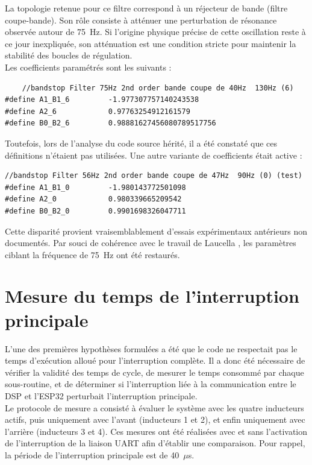 La topologie retenue pour ce filtre correspond à un réjecteur de bande (filtre coupe-bande). Son rôle consiste à atténuer une perturbation de résonance observée autour de 75~Hz. Si l'origine physique précise de cette oscillation reste à ce jour inexpliquée, son atténuation est une condition stricte pour maintenir la stabilité des boucles de régulation.\\

Les coefficients paramétrés sont les suivants :

\begin{verbatim}
    //bandstop Filter 75Hz 2nd order bande coupe de 40Hz  130Hz (6)
#define A1_B1_6         -1.977307757140243538
#define A2_6            0.97763254912161579
#define B0_B2_6         0.98881627456080789517756
\end{verbatim}

Toutefois, lors de l'analyse du code source hérité, il a été constaté que ces définitions n'étaient pas utilisées. Une autre variante de coefficients était active :

\begin{verbatim}
//bandstop Filter 56Hz 2nd order bande coupe de 47Hz  90Hz (0) (test)
#define A1_B1_0         -1.980143772501098
#define A2_0            0.980339665209542
#define B0_B2_0         0.9901698326047711
\end{verbatim}

Cette disparité provient vraisemblablement d'essais expérimentaux antérieurs non documentés. Par souci de cohérence avec le travail de Laucella \cite{Laucella}, les paramètres ciblant la fréquence de 75~Hz ont été restaurés.

\section{Mesure du temps de l'interruption principale}
L'une des premières hypothèses formulées a été que le code ne respectait pas le temps d'exécution alloué pour l'interruption complète. Il a donc été nécessaire de vérifier la validité des temps de cycle, de mesurer le temps consommé par chaque sous-routine, et de déterminer si l'interruption liée à la communication entre le DSP et l'ESP32 perturbait l'interruption principale.\\

Le protocole de mesure a consisté à évaluer le système avec les quatre inducteurs actifs, puis uniquement avec l'avant (inducteurs 1 et 2), et enfin uniquement avec l'arrière (inducteurs 3 et 4). Ces mesures ont été réalisées avec et sans l'activation de l'interruption de la liaison UART afin d'établir une comparaison. Pour rappel, la période de l'interruption principale est de 40~$\mu$s.


